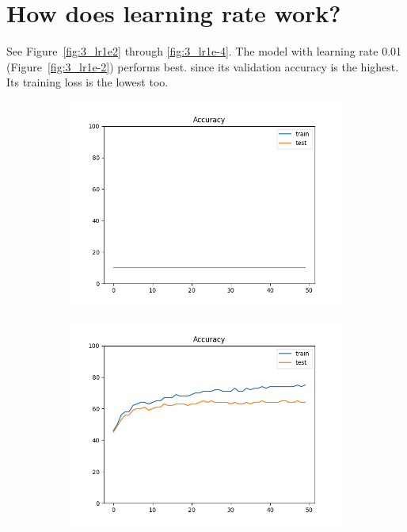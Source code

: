 \documentclass[12pt]{article}
\begin{document}
\section{How does learning rate work?}
See Figure~\ref{fig:3_lr1e2} through \ref{fig:3_lr1e-4}. The model with learning rate 0.01 (Figure~\ref{fig:3_lr1e-2}) performs best. since its validation accuracy is the highest. Its training loss is the lowest too.

\begin{figure}
  \begin{subfigure}{0.19\textwidth}
    \centering
    \includegraphics[width=\linewidth]{accuracies_3_lr1e2.png}
  \end{subfigure}
  \begin{subfigure}{0.19\textwidth}
    \centering
    \includegraphics[width=\linewidth]{accuracies_3_lr1e-1.png}

\end{subfigure}
\end{figure}
\end{document}
